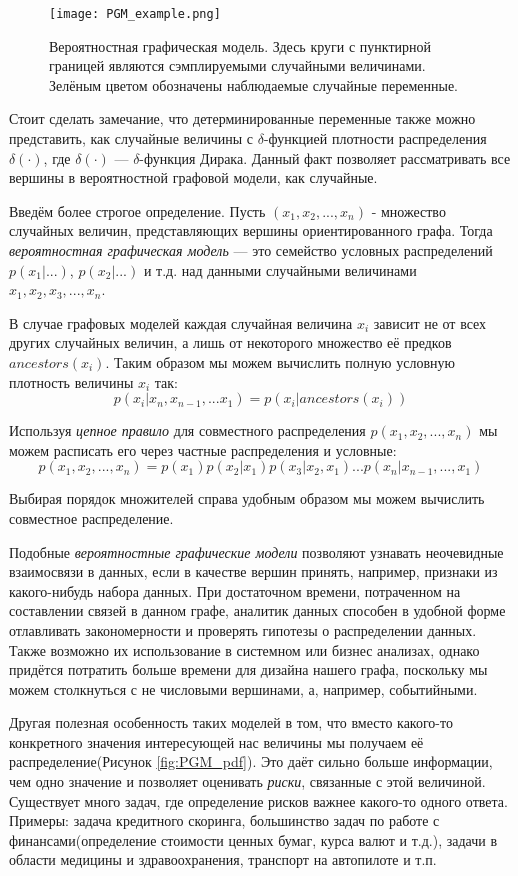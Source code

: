 \begin{figure}[H]
    \centering
    \texttt{[image: PGM\_example.png]}
    \caption{Вероятностная графическая модель. Здесь круги с пунктирной границей являются сэмплируемыми случайными величинами. Зелёным цветом обозначены наблюдаемые случайные переменные.}
    \label{fig:PGM_example}
\end{figure}

Стоит сделать замечание, что детерминированные переменные также можно представить,
 как случайные величины с $\delta$-функцией плотности распределения $\delta(\cdot)$,
 где $\delta(\cdot)$ --- $\delta$-функция Дирака. Данный факт позволяет рассматривать все вершины
 в вероятностной графовой модели, как случайные.

Введём более строгое определение. Пусть $(x_1, x_2, ..., x_n)$ - множество случайных величин, представляющих вершины
 ориентированного графа. Тогда \textit{вероятностная графическая модель} --- это семейство условных распределений $p(x_1 | ...)$, $p(x_2 | ...)$ и т.д. над
 данными случайными величинами $x_1, x_2, x_3, ..., x_n$.

В случае графовых моделей каждая случайная величина $x_i$ зависит не от всех других случайных
 величин, а лишь от некоторого множество её предков $ancestors(x_i)$.
 Таким образом мы можем вычислить полную условную плотность величины $x_i$ так:
$$p(x_i | x_n, x_{n-1}, ... x_1) = p(x_i | ancestors(x_i))$$

Используя \textit{цепное правило} для совместного распределения $p(x_1, x_2, ..., x_n)$ мы можем расписать его
 через частные распределения и условные:
$$p(x_1, x_2, ..., x_n) = p(x_1) p(x_2 | x_1) p(x_3 | x_2, x_1) ... p(x_n | x_{n-1}, ..., x_1)$$

Выбирая порядок множителей справа удобным образом мы можем вычислить совместное распределение.

Подобные \textit{вероятностные графические модели} позволяют узнавать неочевидные взаимосвязи в данных, если в качестве
 вершин принять, например, признаки из какого-нибудь набора данных. При достаточном времени, потраченном на составлении связей в данном графе,
 аналитик данных способен в удобной форме отлавливать закономерности и проверять гипотезы о распределении данных. Также возможно их использование в
 системном или бизнес анализах, однако придётся потратить больше времени для дизайна нашего графа, поскольку мы можем столкнуться с не числовыми вершинами, а, например, событийными.

Другая полезная особенность таких моделей в том, что вместо какого-то конкретного значения интересующей нас величины мы получаем её распределение(Рисунок \ref{fig:PGM_pdf}).
 Это даёт сильно больше информации, чем одно значение и позволяет оценивать \textit{риски}, связанные с этой величиной. Существует много задач, где определение рисков важнее
 какого-то одного ответа. Примеры: задача кредитного скоринга, большинство задач по работе с финансами(определение стоимости ценных бумаг, курса валют и т.д.), задачи в области медицины
 и здравоохранения, транспорт на автопилоте и т.п.

